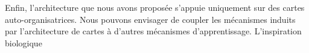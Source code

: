 Enfin, l'architecture que nous avons proposée s'appuie uniquement sur des cartes auto-organisatrices. Nous pouvons envisager de coupler les mécanismes induits par l'architecture de cartes à d'autres mécanismes d'apprentissage. L'inspiration biologique 





